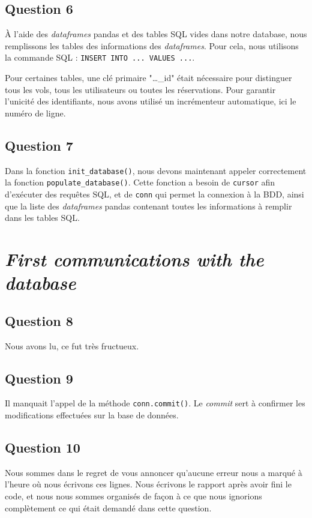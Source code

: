 \documentclass{ceri/sty/rapport}
\begin{document}
\subsection{Question 6}
À l'aide des \textit{dataframes} pandas et des tables SQL vides dans notre database, nous remplissons les tables des informations des \textit{dataframes}.
Pour cela, nous utilisons la commande SQL : \texttt{INSERT INTO ... VALUES ...}.

Pour certaines tables, une clé primaire "…\_id" était nécessaire pour distinguer tous les vols, tous les utilisateurs ou toutes les réservations.
Pour garantir l'unicité des identifiants, nous avons utilisé un incrémenteur automatique, ici le numéro de ligne.

\subsection{Question 7}
Dans la fonction \texttt{init\_database()}, nous devons maintenant appeler correctement la fonction \texttt{populate\_database()}.
Cette fonction a besoin de \texttt{cursor} afin d'exécuter des requêtes SQL, et de \texttt{conn} qui permet la connexion à la BDD, ainsi que la liste des \textit{dataframes} pandas contenant toutes les informations à remplir dans les tables SQL.

\section{\textit{First communications with the database}}
\subsection{Question 8}
Nous avons lu, ce fut très fructueux.

\subsection{Question 9}
Il manquait l'appel de la méthode \texttt{conn.commit()}.
Le \textit{commit} sert à confirmer les modifications effectuées sur la base de données.

\subsection{Question 10}
Nous sommes dans le regret de vous annoncer qu'aucune erreur nous a marqué à l'heure où nous écrivons ces lignes.
Nous écrivons le rapport après avoir fini le code, et nous nous sommes organisés de façon à ce que nous ignorions complètement ce qui était demandé dans cette question.
\end{document}
